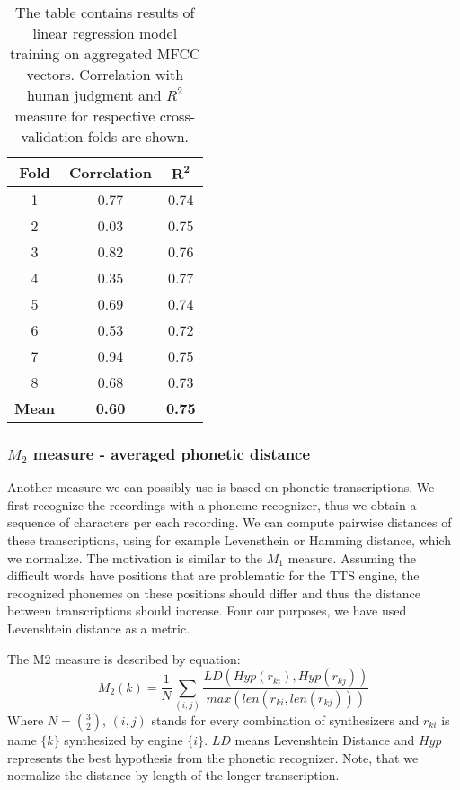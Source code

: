 \begin{table}
\begin{center}
\begin{tabular}{ |c|c|c| } 
 \hline
 \textbf{Fold} & \textbf{Correlation} & $\boldsymbol{R^2}$ \\ \hline
 1 & 0.77 & 0.74 \\ \hline
 2 & 0.03 & 0.75 \\ \hline
 3 & 0.82 & 0.76 \\ \hline
 4 & 0.35 & 0.77 \\ \hline
 5 & 0.69 & 0.74 \\ \hline
 6 & 0.53 & 0.72 \\ \hline
 7 & 0.94 & 0.75 \\ \hline
 8 & 0.68 & 0.73 \\ \hline
 \textbf{Mean} & \textbf{0.60} & \textbf{0.75} \\ \hline
 
 \end{tabular}
\end{center}
\label{cv}
\caption{The table contains results of linear regression model training on aggregated MFCC vectors. Correlation with human judgment and $R^2$ measure for respective cross-validation folds are shown.}
\end{table}
\subsubsection{$M_2$ measure - averaged phonetic distance}
Another measure we can possibly use is based on phonetic transcriptions. We first recognize the recordings with a phoneme recognizer, thus we obtain a sequence of characters per each recording. We can compute pairwise distances of these transcriptions, using for example Levensthein \cite{navarro2001guided} or Hamming distance, which we normalize. The motivation is similar to the $M_1$ measure. Assuming the difficult words have positions that are problematic for the TTS engine, the recognized phonemes on these positions should differ and thus the distance between transcriptions should increase. Four our purposes, we have used Levenshtein distance as a metric.
\par
The M2 measure is described by equation:
\begin{equation}
M_2(k) = \frac{1}{N}\sum_{(i,j)}{\frac{LD(Hyp(r_{ki}),Hyp(r_{kj}))}{max(len(r_{ki},len(r_{kj})))}}
\end{equation}
Where $N = {3\choose2}$, $(i,j)$ stands for every combination of synthesizers and $r_{ki}$ is name $\{k\}$ synthesized by engine $\{i\}$. $LD$ means Levenshtein Distance and $Hyp$ represents the best hypothesis from the phonetic recognizer. Note, that we normalize the distance by length of the longer transcription.


